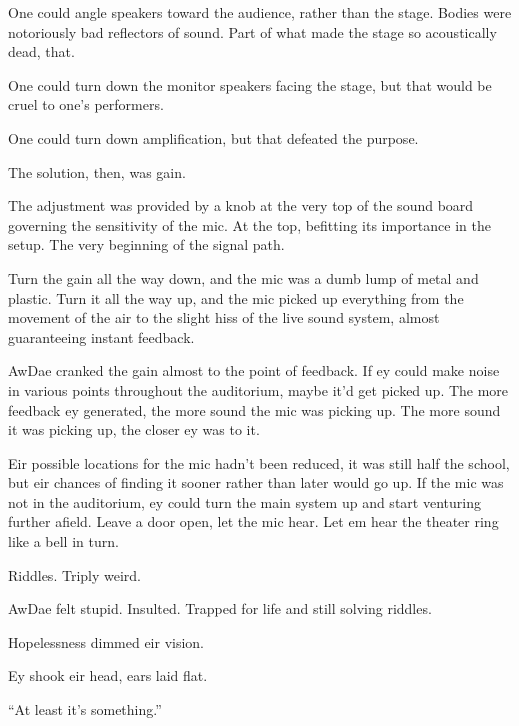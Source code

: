 One could angle speakers toward the audience, rather than the stage. Bodies were notoriously bad reflectors of sound. Part of what made the stage so acoustically dead, that.

One could turn down the monitor speakers facing the stage, but that would be cruel to one's performers.

One could turn down amplification, but that defeated the purpose.

The solution, then, was gain.

The adjustment was provided by a knob at the very top of the sound board governing the sensitivity of the mic. At the top, befitting its importance in the setup. The very beginning of the signal path.

Turn the gain all the way down, and the mic was a dumb lump of metal and plastic. Turn it all the way up, and the mic picked up everything from the movement of the air to the slight hiss of the live sound system, almost guaranteeing instant feedback.

AwDae cranked the gain almost to the point of feedback. If ey could make noise in various points throughout the auditorium, maybe it'd get picked up. The more feedback ey generated, the more sound the mic was picking up. The more sound it was picking up, the closer ey was to it.

Eir possible locations for the mic hadn't been reduced, it was still half the school, but eir chances of finding it sooner rather than later would go up. If the mic was not in the auditorium, ey could turn the main system up and start venturing further afield. Leave a door open, let the mic hear. Let em hear the theater ring like a bell in turn.

Riddles. Triply weird.

AwDae felt stupid. Insulted. Trapped for life and still solving riddles.

Hopelessness dimmed eir vision.\pagebreak

Ey shook eir head, ears laid flat.

``At least it's something.''

